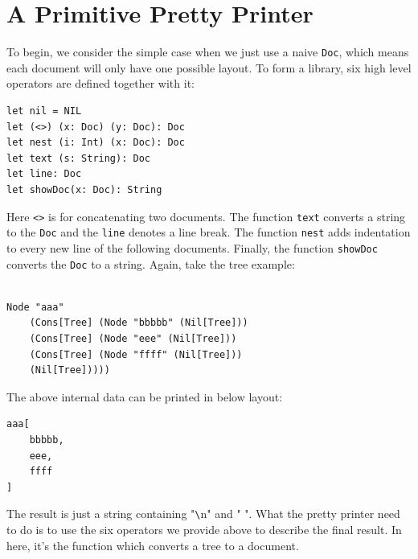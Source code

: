 \section{A Primitive Pretty Printer}

To begin, we consider the simple case when we just use a naive \texttt{Doc}, which means each document will only have one possible layout. To form a library, six high level operators are defined together with it:

\begin{lstlisting}
let nil = NIL
let (<>) (x: Doc) (y: Doc): Doc
let nest (i: Int) (x: Doc): Doc
let text (s: String): Doc
let line: Doc
let showDoc(x: Doc): String
\end{lstlisting}

Here \texttt{<>} is for concatenating two documents. The function \texttt{text} converts a string to the \texttt{Doc} and the \texttt{line} denotes a line break. The function \texttt{nest} adds indentation to every new line of the following documents. Finally, the function \texttt{showDoc} converts the \texttt{Doc} to a string. Again, take the tree example:

\begin{lstlisting}

Node "aaa"
    (Cons[Tree] (Node "bbbbb" (Nil[Tree]))
    (Cons[Tree] (Node "eee" (Nil[Tree]))
    (Cons[Tree] (Node "ffff" (Nil[Tree]))
    (Nil[Tree]))))

\end{lstlisting}

The above internal data can be printed in below layout:

\begin{lstlisting}
aaa[
    bbbbb,
    eee,
    ffff
]
\end{lstlisting}

The result is just a string containing "\verb|\|n" and " ". What the pretty printer need to do is to use the six operators we provide above to describe the final result. In here, it's the function which converts a tree to a document.

